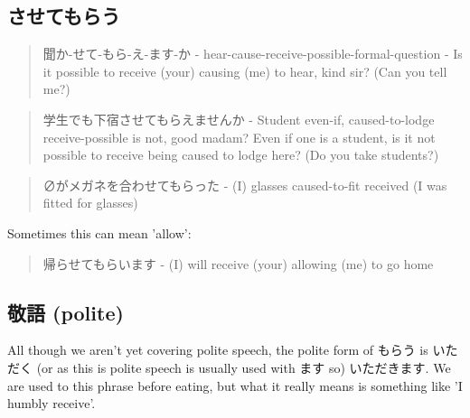 \documentclass[11pt]{article}
\begin{document}
\subsection{させてもらう}
\label{sec:org9dc8271}
\begin{quote}
聞か-せて-もら-え-ます-か - hear-cause-receive-possible-formal-question - Is it possible to receive (your) causing (me) to hear, kind sir? (Can you tell me?)
\end{quote}

\begin{quote}
学生でも下宿させてもらえませんか - Student even-if, caused-to-lodge receive-possible is not, good madam? Even if one is a student, is it not possible to receive being caused to lodge here? (Do you take students?)
\end{quote}

\begin{quote}
∅がメガネを合わせてもらった - (I) glasses caused-to-fit received (I was fitted for glasses)
\end{quote}

Sometimes this can mean 'allow':
\begin{quote}
帰らせてもらいます - (I) will receive (your) allowing (me) to go home
\end{quote}

\subsection{敬語 (polite)}
\label{sec:org021b240}
All though we aren't yet covering polite speech, the polite form of もらう is いただく (or as this is polite speech is usually used with ます so) いただきます. We are used to this phrase before eating, but what it really means is something like 'I humbly receive'.
\end{document}
